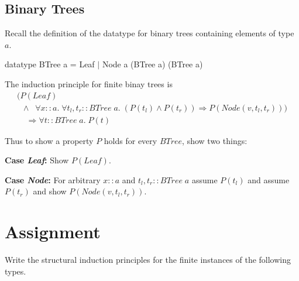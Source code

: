 \documentclass[11pt]{article}
\begin{document}
\subsection{Binary Trees}
Recall the definition of the datatype for binary trees containing elements of type $a$.
\begin{program**}
\> datatype  BTree a = Leaf $\mid$  Node a (BTree a) (BTree a)
\end{program**}
The induction principle for finite binay trees is 
\[\begin{array}{l}
(P({\mathit{Leaf}})\\ \;\;\wedge\;\; \forall{}x\!::\!a.\;\forall{}t_l,t_r\!::\!BTree\;a. \; (P(t_l) \wedge P(t_r)) \Rightarrow P({\mathit{Node}}(v,t_l,t_r)))  \\\;\;\;\; \Rightarrow \forall{}t\!::\!BTree\;a.\; P(t)
\end{array}\]

Thus to show a property $P$ holds for every $BTree$, show two things:
\begin{description}
\item{\bf{Case} {\it{Leaf}}:} Show $P({\mathit{Leaf}})$.\vspace{-.5em}
\item{\bf{Case} {\it{Node}}:} For arbitrary $x\!::\!a$ and $t_l,t_r\!::\!BTree\;a$ assume $P(t_l)$ and assume $P(t_r)$ and show $P({\mathit{Node}}(v,t_l,t_r))$.
\end{description}


\section{Assignment}

Write the structural induction principles for the finite instances of the following types.
\end{document}
